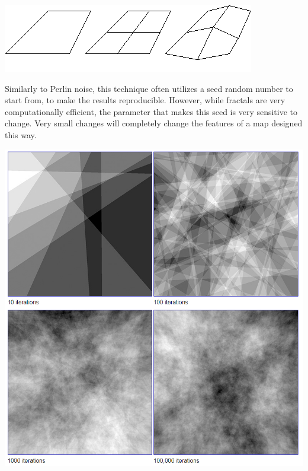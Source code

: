 \documentclass[10pt]{report}
\begin{document}
		\begin{minipage}{\textwidth}
			\centering
			\includegraphics[scale=1]{landscapes}
			\label{fig:spatsub}
		\end{minipage}
		
		Similarly to Perlin noise, this technique often utilizes a seed random number to start from, to make the results reproducible. However, while fractals are very computationally efficient, the parameter that makes this seed is very sensitive to change. Very small changes will completely change the features of a map designed this way.
		
		\begin{minipage}{\textwidth}
			\centering
			\includegraphics[scale=.4]{fractal-noise}
			\label{fig:fractal-land}
		\end{minipage}
		
\end{document}
